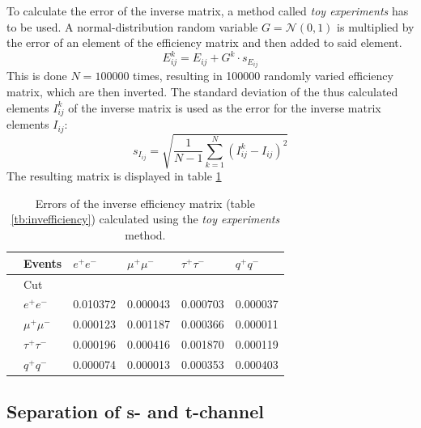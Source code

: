 To calculate the error of the inverse matrix, a method called \emph{toy experiments} has to be used. A normal-distribution random variable $G=\mathcal{N}(0,1)$ is multiplied by the error of an element of the efficiency matrix and then added to said element.
\begin{equation}
E^{k}_{ij}=E_{ij}+G^k\cdot s_{E_{ij}}
\end{equation}
This is done $N=100000$ times, resulting in 100000 randomly varied efficiency matrix, which are then inverted. The standard deviation of the thus calculated elements $I^k_{ij}$ of the inverse matrix is used as the error for the inverse matrix elements $I_{ij}$: 
\begin{equation}
s_{I_{ij}}=\sqrt{\frac{1}{N-1}\sum_{k=1}^{N}\left(I^k_{ij}-I_{ij}\right)^2}
\end{equation}
The resulting matrix is displayed in table \ref{tb:invefficiencyerror}
\begin{table}[H]\centering
	\begin{tabular}{@{}llllll@{}}
		\toprule
		&Events &$e^+e^-$&$\mu^+\mu^-$&$\tau^+\tau^-$&$q^+q^-$\\
		\midrule
		&Cut&&&&\\
		&$e^+e^-$&0.010372&0.000043&0.000703&0.000037\\
		&$\mu^+\mu^-$&0.000123&0.001187&0.000366&0.000011\\
		&$\tau^+\tau^-$&0.000196&0.000416&0.001870&0.000119\\
		&$q^+q^-$&0.000074&0.000013&0.000353&0.000403\\
		\bottomrule
	\end{tabular}
	\caption[Inverse efficiency error matrix]{Errors of the inverse efficiency matrix (table \ref{tb:invefficiency}) calculated using the \emph{toy experiments} method.}
	\label{tb:invefficiencyerror}
\end{table}

\subsection{Separation of s- and t-channel}

